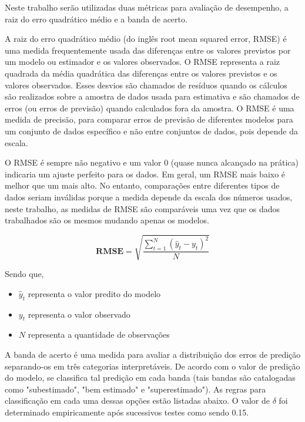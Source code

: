 Neste trabalho serão utilizadas duas métricas para avaliação de desempenho, a raiz do erro quadrático médio e a banda de acerto.

A raiz do erro quadrático médio (do inglês root mean squared error, RMSE) é uma medida frequentemente usada das diferenças entre os valores previstos por um modelo ou estimador e os valores observados. O RMSE representa a raiz quadrada da média quadrática das diferenças entre os valores previstos e os valores observados. Esses desvios são chamados de resíduos quando os cálculos são realizados sobre a amostra de dados usada para estimativa e são chamados de erros (ou erros de previsão) quando calculados fora da amostra. O RMSE é uma medida de precisão, para comparar erros de previsão de diferentes modelos para um conjunto de dados específico e não entre conjuntos de dados, pois depende da escala.

O RMSE é sempre não negativo e um valor 0 (quase nunca alcançado na prática) indicaria um ajuste perfeito para os dados. Em geral, um RMSE mais baixo é melhor que um mais alto. No entanto, comparações entre diferentes tipos de dados seriam inválidas porque a medida depende da escala dos números usados, neste trabalho, as medidas de RMSE são comparáveis uma vez que os dados trabalhados são os mesmos mudando apenas os modelos.

\begin{equation}
\mathbf {RMSE} ={\sqrt {\frac {\sum _{t=1}^{N}({\hat {y}}_{t}-y_{t})^{2}}{N}}}
\end{equation}

Sendo que,

\begin{itemize}
    \item $ \hat y_t $ representa o valor predito do modelo
    \item $ y_t $ representa o valor observado
    \item $ N $ representa a quantidade de observações
\end{itemize}

A banda de acerto é uma medida para avaliar a distribuição dos erros de predição separando-os em três categorias interpretáveis. De acordo com o valor de predição do modelo, se classifica tal predição em cada banda (tais bandas são catalogadas como "subestimado", "bem estimado" e "superestimado"). As regras para classificação em cada uma dessas opções estão listadas abaixo. O valor de $ \delta $ foi determinado empiricamente após sucessivos testes como sendo 0.15.

